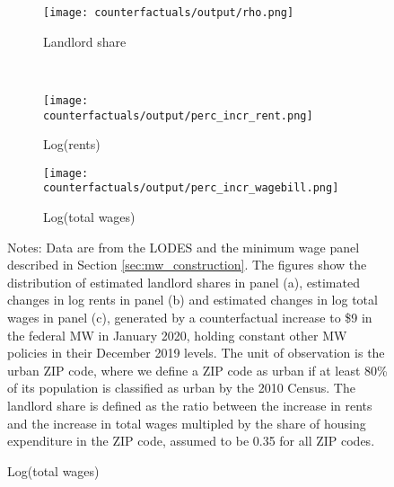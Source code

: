 \begin{figure}[h!]
    \centering
    \caption{Distributions of estimated landlord shares and counterfactual 
                changes in rents and total wages, urban ZIP codes}
    \label{fig:cf_hist_rents_wages_shares}

    \begin{subfigure}{0.65\textwidth}
        \caption*{Landlord share}
        \texttt{[image: counterfactuals/output/rho.png]}
    \end{subfigure}\\
    \begin{subfigure}{0.5\textwidth}
        \texttt{[image: counterfactuals/output/perc\_incr\_rent.png]}
        \caption*{Log(rents)}
    \end{subfigure}%
    \begin{subfigure}{0.5\textwidth}
        \texttt{[image: counterfactuals/output/perc\_incr\_wagebill.png]}
        \caption*{Log(total wages)}
    \end{subfigure}

    \begin{minipage}{.95\textwidth} \footnotesize
        \vspace{3mm}
        Notes: 
        Data are from the LODES and the minimum wage panel described in Section 
        \ref{sec:mw_construction}.
        The figures show the distribution of estimated landlord shares in 
        panel (a), estimated changes in log rents in panel (b) and 
        estimated changes in log total wages in panel (c),
        generated by a counterfactual increase to \$9 in the federal MW in 
        January 2020, holding constant other MW policies in their December 2019 
        levels.
        The unit of observation is the urban ZIP code, where we define a ZIP code 
        as urban if at least 80\% of its population is classified as urban by
        the 2010 Census.
        The landlord share is defined as the ratio between the increase in rents
        and the increase in total wages multipled by the share of housing 
        expenditure in the ZIP code, assumed to be 0.35 for all ZIP codes.
    \end{minipage}
\end{figure}
